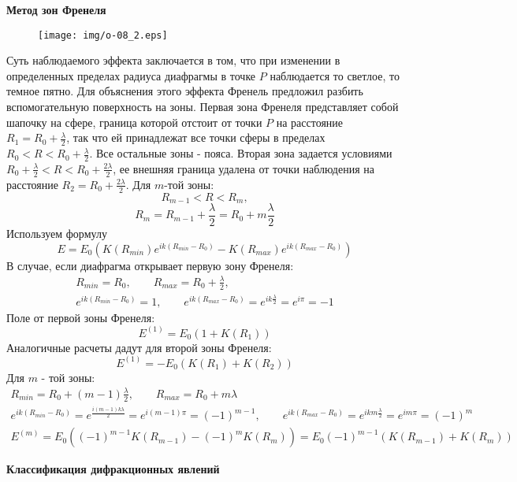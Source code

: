 \textbf{Метод зон Френеля}\\

\begin{figure}[h]
\begin{center}
\texttt{[image: img/o-08\_2.eps]}
\end{center}
\end{figure}

Суть наблюдаемого эффекта заключается в том, что при изменении в определенных пределах радиуса диафрагмы в точке $P$ наблюдается то светлое, то темное пятно. Для объяснения этого эффекта Френель предложил разбить вспомогательную поверхность на зоны. Первая зона Френеля представляет собой шапочку на сфере, граница которой отстоит от точки $P$ на расстояние $R_1 = R_0 + \frac{\lambda}{2}$, так что ей принадлежат все точки сферы в пределах $R_0 < R < R_0 + \frac{\lambda}{2}$. Все остальные зоны - пояса. Вторая зона задается условиями $R_0 + \frac{\lambda}{2} < R < R_0 + \frac{2\lambda}{2}$, ее внешняя граница удалена от точки наблюдения на расстояние $R_2 = R_0 + \frac{2\lambda}{2}$. Для $m$-той зоны:
$$R_{m-1} < R < R_m,$$
$$R_m = R_{m-1} + \frac{\lambda}{2} = R_0 + m\frac{\lambda}{2}$$
Используем формулу
$$E = E_0\left(K(R_{min}) e^{ik(R_{min} - R_0)} - K(R_{max})e^{ik(R_{max} - R_0)} \right)$$
В случае, если диафрагма открывает первую зону Френеля:
\begin{gather*}
R_{min} = R_0, \qquad R_{max} = R_0 + \frac{\lambda}{2} , \\
 e^{ik(R_{min} - R_0)} = 1, \qquad e^{ik(R_{max} - R_0)} = e^{ik\frac{\lambda}{2}} = e^{i\pi} = -1
\end{gather*}
Поле от первой зоны Френеля:
$$E^{(1)} = E_0(1 + K(R_1))$$
Аналогичные расчеты дадут для второй зоны Френеля:
$$E^{(1)} = - E_0(K(R_1) + K(R_2))$$
Для $m$ - той зоны:
\begin{gather*}
R_{min} = R_0 + (m - 1)\frac{\lambda}{2}, \qquad R_{max} = R_0 + m\lambda \\
e^{ik(R_{min} - R_0)} = e^{\frac{i(m-1)k\lambda}{2}} = e^{i(m-1)\pi} = (-1)^{m-1}, \qquad 
e^{ik(R_{max} - R_0)} = e^{ikm\frac{\lambda}{2}} = e^{im\pi} = (-1)^m\\
E^{(m)} = E_0\left((-1)^{m-1} K(R_{m-1}) - (-1)^m K(R_m)\right) = E_0(-1)^{m-1} (K(R_{m-1}) + K(R_m))
\end{gather*} 

\textbf{Классификация дифракционных явлений}\\

